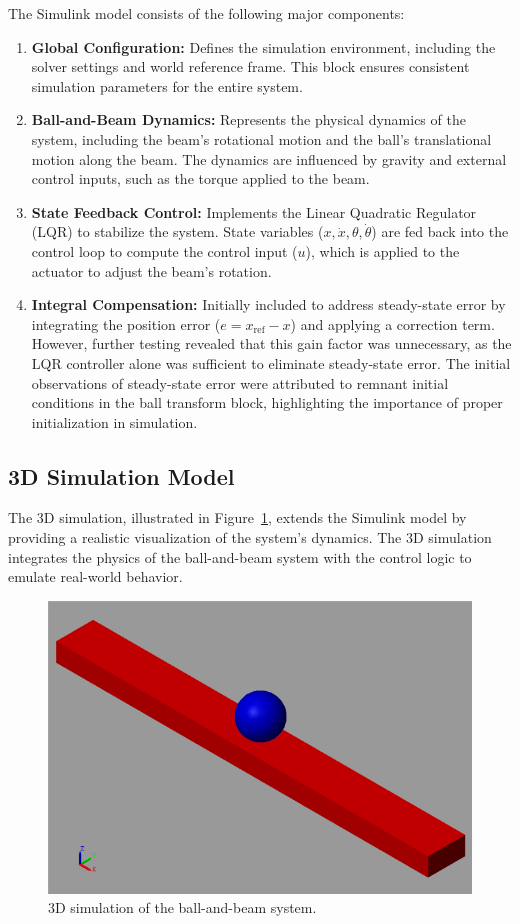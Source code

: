 \documentclass[conference]{IEEEtran}
\begin{document}
The Simulink model consists of the following major components:
\begin{enumerate}
    \item \textbf{Global Configuration:}
    Defines the simulation environment, including the solver settings and world reference frame. This block ensures consistent simulation parameters for the entire system.
    \item \textbf{Ball-and-Beam Dynamics:}
    Represents the physical dynamics of the system, including the beam's rotational motion and the ball's translational motion along the beam. The dynamics are influenced by gravity and external control inputs, such as the torque applied to the beam.
    \item \textbf{State Feedback Control:}
    Implements the Linear Quadratic Regulator (LQR) to stabilize the system. State variables (\(x, \dot{x}, \theta, \dot{\theta}\)) are fed back into the control loop to compute the control input (\(u\)), which is applied to the actuator to adjust the beam's rotation.
    \item \textbf{Integral Compensation:}
    Initially included to address steady-state error by integrating the position error (\(e = x_{\text{ref}} - x\)) and applying a correction term. However, further testing revealed that this gain factor was unnecessary, as the LQR controller alone was sufficient to eliminate steady-state error. The initial observations of steady-state error were attributed to remnant initial conditions in the ball transform block, highlighting the importance of proper initialization in simulation.
\end{enumerate}


\subsection{3D Simulation Model}
\label{subsec:3d_simulation}

The 3D simulation, illustrated in Figure~\ref{fig:3d_model}, extends the Simulink model by providing a realistic visualization of the system's dynamics. The 3D simulation integrates the physics of the ball-and-beam system with the control logic to emulate real-world behavior.

\begin{figure}[h]
    \centering
    \includegraphics[width=0.7\linewidth]{figures/3D_Model.png}
    \caption[]{3D simulation of the ball-and-beam system.}
    \label{fig:3d_model}
\end{figure}
\end{document}
